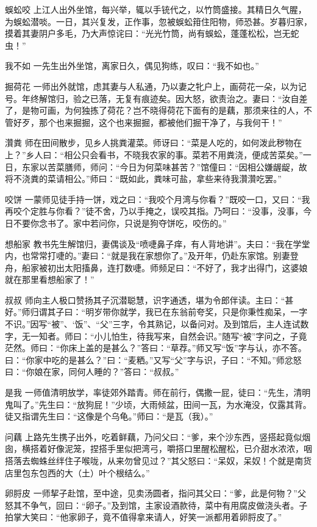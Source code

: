 \documentclass[12pt,UTF8]{ctexbook}
\begin{document}
蜈蚣咬
上江人出外坐馆，每兴举，辄以手铳代之，以竹筒盛接。其精日久气腥，为蜈蚣潜啖。一日，其兴复发，正作事，忽被蜈蚣箝住阳物，师恐甚。岁暮归家，摸着其妻阴户多毛，乃大声惊诧曰：“光光竹筒，尚有蜈蚣，蓬蓬松松，岂无蛇虫！”

我不如
一先生出外坐馆，离家日久，偶见狗练，叹曰：“我不如也。”

掘荷花
一师出外就馆，虑其妻与人私通，乃以妻之牝户上，画荷花一朵，以为记号。年终解馆归，验之已落，无复有痕迹矣。因大怒，欲责治之。妻曰：“汝自差了，是物可画，为何独拣了荷花？岂不晓得荷花下面有的是藕，那须来往的人，不管好歹，那个也来掘掘，这个也来掘掘，都被他们掘干净了，与我何干！”

灒粪
师在田间散步，见乡人挑粪灌菜。师讶曰：“菜是人吃的，如何泼此秽物在上？”乡人曰：“相公只会看书，不晓我农家的事。菜若不用粪浇，便成苦菜矣。”一日，东家以苦菜膳师，师问：“今日为何菜味甚苦？”馆僮曰：“因相公嫌龌龊，故将不浇粪的菜请相公。”师曰：“既如此，粪味可盐，拿些来待我灒灒吃罢。”

咬饼
一蒙师见徒手持一饼，戏之曰：“我咬个月湾与你看？”既咬一口，又曰：“我再咬个定胜与你看？”徒不舍，乃以手掩之，误咬其指。乃呵曰：“没事，没事，今日不要你念书了。家中若问你，只说是狗夺饼吃，咬伤的。”

想船家
教书先生解馆归，妻偶谈及“喷啑鼻子痒，有人背地讲”。夫曰：“我在学堂内，也常常打啑的。”妻曰：“就是我在家想你了。”及开年，仍赴东家馆。别妻登舟，船家被初出太阳搐鼻，连打数啑。师频足曰：“不好了，我才出得门，这婆娘就在那里看想船家了！”

叔叔
师向主人极口赞扬其子沉潜聪慧，识字通透，堪为令郎伴读。主曰：“甚好。”师归谓其子曰：“明岁带你就学，我已在东翁前夸奖，只是你秉性痴呆，一字不识。”因写“被”、‘饭”、“父”三字，令其熟记，以备问对。及到馆后，主人连试数字，无一知者。师曰：“小儿怕生，待我写来，自然会识。”随写“被”字问之，子竟茫然。师曰：“你床上盖的是甚么？”答曰：“草荐。”师又写“饭”字与认，亦不答。曰：“你家中吃的是甚么？”曰：“麦粞。”又写“父”字与识，子曰：“不知。”师忿怒曰：“你娘在家，同何人睡的？”答曰：“叔叔。”

是我
一师值清明放学，率徒郊外踏青。师在前行，偶撒一屁，徒曰：“先生，清明鬼叫了。”先生曰：“放狗屁！”少顷，大雨倾盆，田间一瓦，为水淹没，仅露其背。徒又指谓先生曰：“这像是个乌龟。”师曰：“是瓦（我）。”

问藕
上路先生携子出外，吃着鲜藕，乃问父曰：“爹，来个沙东西，竖搭起竟似烟囱，横搭着好像泥笼，捏搭手里似把湾弓，嚼搭口里醒松醒松，已介甜水浓浓，咽搭落去蜘蛛丝绊住子喉咙，从来勿曾见过？”其父怒曰：“呆奴，呆奴！个就是南货店里包东包西的大（土）叶个根结么。”

卵脟皮
一师挈子赴馆，至中途，见卖汤圆者，指问其父曰：“爹，此是何物？”父怒其不争气，回曰：“卵子。”及到馆，主家设酒款待，菜中有用腐皮做浇头者。子拍掌大笑曰：“他家卵子，竟不值得拿来请人，好笑一派都用着卵脟皮了。”
\end{document}
